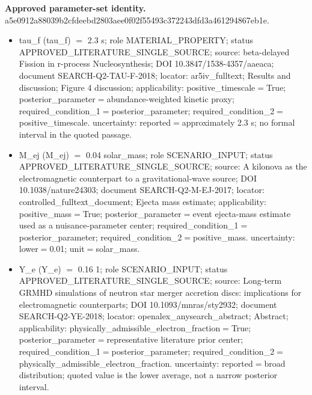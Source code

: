 \documentclass[11pt]{article}
\begin{document}
\noindent\textbf{Approved parameter-set identity.} a5e0912a88039b2c\allowbreak{}fdeebd2803aee0f0\allowbreak{}2f55493c372243df\allowbreak{}d3a461294867eb1e.
\begin{itemize}\raggedright
\item tau\_\allowbreak{}f (tau\_\allowbreak{}f) \ensuremath{=} 2.3 s; role MATERIAL\_\allowbreak{}PROPERTY; status APPROVED\_\allowbreak{}LITERATURE\_\allowbreak{}SINGLE\_\allowbreak{}SOURCE; source: beta-delayed Fission in r-process Nucleosynthesis; DOI 10.3847/\allowbreak{}1538-4357/\allowbreak{}aaeaca; document SEARCH-Q2-TAU-F-2018; locator: ar5iv\_\allowbreak{}fulltext; Results and discussion; Figure 4 discussion; applicability: positive\_\allowbreak{}timescale\ensuremath{=}True; posterior\_\allowbreak{}parameter\ensuremath{=}abundance-weighted kinetic proxy; required\_\allowbreak{}condition\_\allowbreak{}1\ensuremath{=}posterior\_\allowbreak{}parameter; required\_\allowbreak{}condition\_\allowbreak{}2\ensuremath{=}positive\_\allowbreak{}timescale. uncertainty: reported\ensuremath{=}approximately 2.3 s; no formal interval in the quoted passage.
\item M\_\allowbreak{}ej (M\_\allowbreak{}ej) \ensuremath{=} 0.04 solar\_\allowbreak{}mass; role SCENARIO\_\allowbreak{}INPUT; status APPROVED\_\allowbreak{}LITERATURE\_\allowbreak{}SINGLE\_\allowbreak{}SOURCE; source: A kilonova as the electromagnetic counterpart to a gravitational-wave source; DOI 10.1038/\allowbreak{}nature24303; document SEARCH-Q2-M-EJ-2017; locator: controlled\_\allowbreak{}fulltext\_\allowbreak{}document; Ejecta mass estimate; applicability: positive\_\allowbreak{}mass\ensuremath{=}True; posterior\_\allowbreak{}parameter\ensuremath{=}event ejecta-mass estimate used as a nuisance-parameter center; required\_\allowbreak{}condition\_\allowbreak{}1\ensuremath{=}posterior\_\allowbreak{}parameter; required\_\allowbreak{}condition\_\allowbreak{}2\ensuremath{=}positive\_\allowbreak{}mass. uncertainty: lower\ensuremath{=}0.01; unit\ensuremath{=}solar\_\allowbreak{}mass.
\item Y\_\allowbreak{}e (Y\_\allowbreak{}e) \ensuremath{=} 0.16 1; role SCENARIO\_\allowbreak{}INPUT; status APPROVED\_\allowbreak{}LITERATURE\_\allowbreak{}SINGLE\_\allowbreak{}SOURCE; source: Long-term GRMHD simulations of neutron star merger accretion discs: implications for electromagnetic counterparts; DOI 10.1093/\allowbreak{}mnras/\allowbreak{}sty2932; document SEARCH-Q2-YE-2018; locator: openalex\_\allowbreak{}anysearch\_\allowbreak{}abstract; Abstract; applicability: physically\_\allowbreak{}admissible\_\allowbreak{}electron\_\allowbreak{}fraction\ensuremath{=}True; posterior\_\allowbreak{}parameter\ensuremath{=}representative literature prior center; required\_\allowbreak{}condition\_\allowbreak{}1\ensuremath{=}posterior\_\allowbreak{}parameter; required\_\allowbreak{}condition\_\allowbreak{}2\ensuremath{=}physically\_\allowbreak{}admissible\_\allowbreak{}electron\_\allowbreak{}fraction. uncertainty: reported\ensuremath{=}broad distribution; quoted value is the lower average, not a narrow posterior interval.

\end{itemize}
\end{document}
